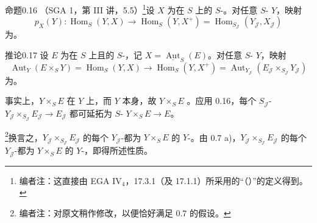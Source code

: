 \begin{SGAresult}{命题}{0.16}
（SGA 1，第 III 讲，5.5）\footnote{编者注：这直接由 EGA IV$_4$，17.3.1（及 17.1.1）所采用的“（）”的定义得到。}设 $X$ 为在 $S$ 上的 $S$-。对任意 $S$- $Y$，映射
\[p_X(Y):\operatorname{Hom}_S(Y,X)\longrightarrow\operatorname{Hom}_S(Y,X^+)=\operatorname{Hom}_{S_{\mathcal J}}(Y_{\mathcal J},X_{\mathcal J})\]
为。
\end{SGAresult}
\begin{SGAresult}{推论}{0.17}
设 $E$ 为在 $S$ 上且的 $S$-，记 $X=\underline{\operatorname{Aut}}_S(E)$。对任意 $S$- $Y$，映射
\[\operatorname{Aut}_Y(E\times_S Y)=\operatorname{Hom}_S(Y,X)\longrightarrow\operatorname{Hom}_S(Y,X^+)=\operatorname{Aut}_{Y_{\mathcal J}}(E_{\mathcal J}\times_{S_{\mathcal J}}Y_{\mathcal J})\]
为。
\end{SGAresult}
事实上，$Y\times_S E$ 在 $Y$ 上，而 $Y$ 本身，故 $Y\times_S E$ 。应用 0.16，每个 $S_{\mathcal J}$- $Y_{\mathcal J}\times_{S_{\mathcal J}}E_{\mathcal J}\to E_{\mathcal J}$ 都可延拓为 $S$- $Y\times_S E\to E$。

\footnote{编者注：对原文稍作修改，以便恰好满足 0.7 的假设。}换言之，$Y_{\mathcal J}\times_{S_{\mathcal J}}E_{\mathcal J}$ 的每个 $Y_{\mathcal J}$-都为 $Y\times_S E$ 的 $Y$-。由 0.7 a)，$Y_{\mathcal J}\times_{S_{\mathcal J}}E_{\mathcal J}$ 的每个 $Y_{\mathcal J}$-都为 $Y\times_S E$ 的 $Y$-，即得所述性质。
